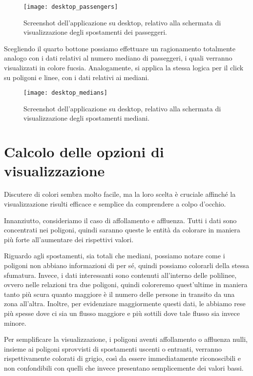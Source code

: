 \begin{figure}[H]
    \centering
    \texttt{[image: desktop\_passengers]}
    \caption[Screenshot degli spostamenti dei passeggeri su desktop]{Screenshot dell'applicazione su desktop, relativo alla schermata di visualizzazione degli spostamenti dei passeggeri.}
    \label{fig:desktop_passengers}
\end{figure}

Scegliendo il quarto bottone possiamo effettuare un ragionamento totalmente analogo con i dati relativi al numero mediano di passeggeri, i quali verranno visualizzati in colore fucsia. Analogamente, si applica la stessa logica per il click su poligoni e linee, con i dati relativi ai mediani.

\begin{figure}[H]
    \centering
    \texttt{[image: desktop\_medians]}
    \caption[Screenshot degli spostamenti mediani su desktop]{Screenshot dell'applicazione su desktop, relativo alla schermata di visualizzazione degli spostamenti mediani.}
    \label{fig:desktop_medians}
\end{figure}

\section{Calcolo delle opzioni di visualizzazione}
Discutere di colori sembra molto facile, ma la loro scelta è cruciale affinché la visualizzazione risulti efficace e semplice da comprendere a colpo d'occhio.

Innanziutto, consideriamo il caso di affollamento e affluenza. Tutti i dati sono concentrati nei poligoni, quindi saranno queste le entità da colorare in maniera più forte all'aumentare dei rispettivi valori.

Riguardo agli spostamenti, sia totali che mediani, possiamo notare come i poligoni non abbiano informazioni di per sé, quindi possiamo colorarli della stessa sfumatura. Invece, i dati interessanti sono contenuti all'interno delle polilinee, ovvero nelle relazioni tra due poligoni, quindi coloreremo quest'ultime in maniera tanto più scura quanto maggiore è il numero delle persone in transito da una zona all'altra. Inoltre, per evidenziare maggiormente questi dati, le abbiamo rese più spesse dove ci sia un flusso maggiore e più sottili dove tale flusso sia invece minore.

Per semplificare la visualizzazione, i poligoni aventi affollamento o affluenza nulli, insieme ai poligoni sprovvisti di spostamenti uscenti o entranti, verranno rispettivamente colorati di grigio, così da essere immediatamente riconoscibili e non confondibili con quelli che invece presentano semplicemente dei valori bassi.

